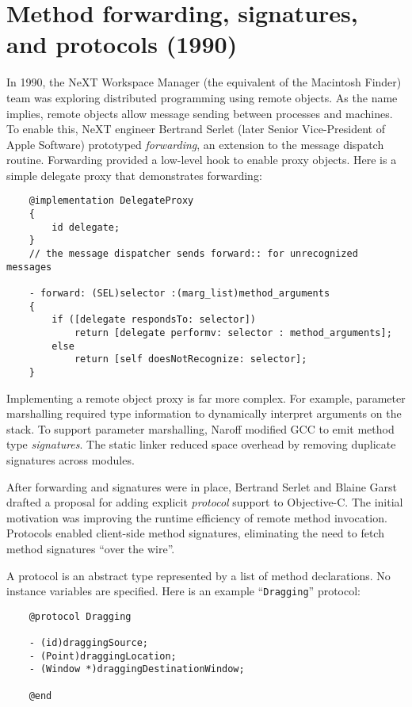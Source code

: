 \documentclass[acmsmall,screen]{acmart}
\begin{document}
\section{Method forwarding, signatures, and protocols (1990)}
\label{sec-forwarding/protocols1990}
In 1990, the NeXT Workspace Manager (the equivalent of the Macintosh Finder) team was exploring distributed programming using remote objects. As the name implies, remote objects allow message sending between processes and machines. To enable this, NeXT engineer Bertrand Serlet (later Senior Vice-President of Apple Software) prototyped \emph{forwarding}, an extension to the message dispatch routine. Forwarding provided a low-level hook to enable proxy objects.  Here is a simple delegate proxy that demonstrates forwarding:
\begin{verbatim}
    @implementation DelegateProxy
    {
        id delegate; 
    }
    // the message dispatcher sends forward:: for unrecognized messages

    - forward: (SEL)selector :(marg_list)method_arguments
    {
        if ([delegate respondsTo: selector])
            return [delegate performv: selector : method_arguments];
        else
            return [self doesNotRecognize: selector];
    }
\end{verbatim}

Implementing a remote object proxy is far more complex. For example, parameter marshalling required type information to dynamically interpret arguments on the stack. To support parameter marshalling, Naroff modified GCC to emit method type \emph{signatures}. The static linker reduced space overhead by removing duplicate signatures across modules. 

After forwarding and signatures were in place, Bertrand Serlet and Blaine Garst drafted a proposal for adding explicit \emph{protocol} support to Objective-C. The initial motivation was improving the runtime efficiency of remote method invocation. Protocols enabled client-side method signatures, eliminating the need to fetch method signatures ``over the wire''.

A protocol is an abstract type represented by a list of method declarations. No instance variables are specified. Here is an example ``\verb$Dragging$'' protocol:
\begin{verbatim}
    @protocol Dragging 

    - (id)draggingSource;
    - (Point)draggingLocation;
    - (Window *)draggingDestinationWindow;

    @end
\end{verbatim}
\end{document}
